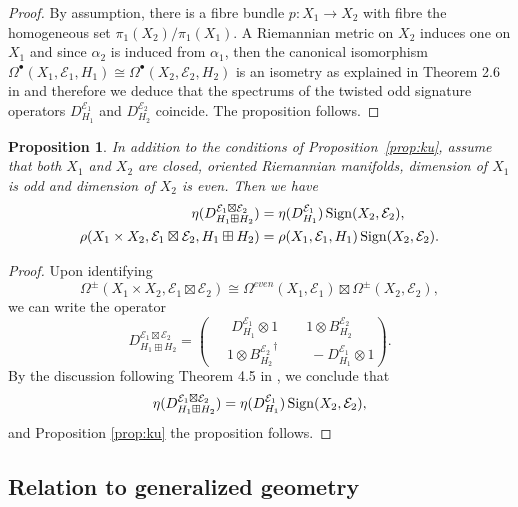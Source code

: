 \documentclass[12pt]{amsart}
\theoremstyle{plain}
\newtheorem{proposition}[theorem]{Proposition}
\theoremstyle{definition}
\theoremstyle{remark}
\begin{document}
{\begin{proof}
By assumption, there is a fibre bundle $p: X_1 \to X_2$ with fibre the homogeneous set $\pi_1(X_2)/\pi_1(X_1)$.
A Riemannian metric on $X_2$ induces one on $X_1$ and since $\alpha_2$ is induced from $\alpha_1$, then 
the canonical isomorphism 
$\Omega^\bullet(X_1,{\mathcal E}_1,H_1)\cong\Omega^\bullet(X_2,{\mathcal E}_2,H_2)$
is an isometry as explained in Theorem 2.6 in \cite{RS} and therefore we deduce that the
spectrums of the twisted odd signature operators
$D^{{\mathcal E}_1}_{H_1}$ and 
$D^{{\mathcal E}_2}_{H_2}$  coincide. The proposition follows.
\end{proof}

\begin{proposition}
In addition to the conditions of Proposition~\ref{prop:ku}, assume that both
$X_1$ and $X_2$ are closed, oriented Riemannian manifolds, dimension of $X_1$ is odd and 
dimension of $X_2$ is even.
Then we have
\begin{align*}
\eta(D^{{\mathcal E}_1\boxtimes{\mathcal E}_2}_{H_1\boxplus H_2}) & = 
\eta(D^{{\mathcal E}_1}_{H_1})\, {\rm Sign}(X_2,{\mathcal E}_2),\\
\rho (X_1\times X_2,{\mathcal E}_1\boxtimes{\mathcal E}_2,H_1\boxplus H_2) & =
\rho(X_1,{\mathcal E}_1,H_1)\, {\rm Sign}(X_2,{\mathcal E}_2).
\end{align*}
\end{proposition}

\begin{proof} Upon identifying 
$$
\Omega^\pm(X_1\times X_2,{\mathcal E}_1\boxtimes{\mathcal E}_2) \cong 
\Omega^{even}(X_1,{\mathcal E}_1)\boxtimes \Omega^\pm(X_2,{\mathcal E}_2),
$$
we can write the operator 
$$
D^{{\mathcal E}_1\boxtimes{\mathcal E}_2}_{H_1\boxplus H_2} = {D^{{\mathcal E}_1}_{H_1} \otimes 1\qquad
1\otimes B^{{\mathcal E}_2}_{H_2}
\choose\quad\; 1\otimes
{B^{{\mathcal E}_2}_{H_2}}^\dagger
 \qquad \;-D^{{\mathcal E}_1}_{H_1} \otimes 1}.
$$
By the discussion following Theorem 4.5 in \cite{APS3}, we conclude that
$$
\eta(D^{{\mathcal E}_1\boxtimes{\mathcal E}_2}_{H_1\boxplus H_2})  = 
\eta(D^{{\mathcal E}_1}_{H_1})\, {\rm Sign}(X_2,{\mathcal E}_2),
$$
and Proposition \ref{prop:ku} the proposition follows.
\end{proof}

\subsection{Relation to generalized geometry}

}
\end{document}
